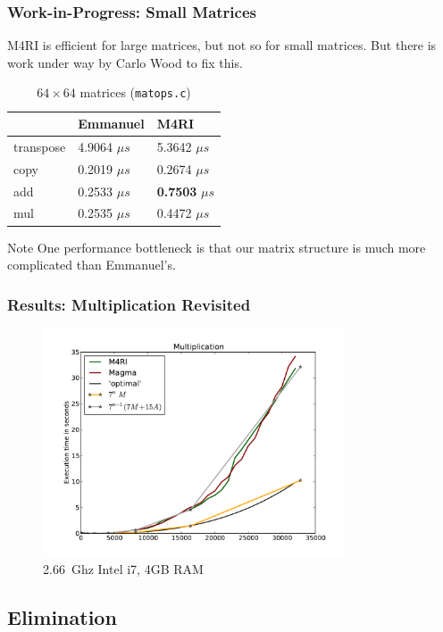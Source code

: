 \documentclass[11pt]{beamer}
\def\hlt{\color{yellow}}
\begin{document}
\begin{frame}
\frametitle{Work-in-Progress: Small Matrices}

M4RI is efficient for large matrices, but not so for small matrices. But there is work under way by Carlo Wood to fix this.

\begin{table}
\begin{tabular}{|l|l|l|}
\hline
 & Emmanuel & M4RI \\ 
\hline
transpose & 4.9064 $\mu s$ & 5.3642 $\mu s$ \\
copy      & 0.2019 $\mu s$ & 0.2674 $\mu s$ \\
add       & 0.2533 $\mu s$ & \textbf{\hlt 0.7503} $\mu s$ \\
mul       & 0.2535 $\mu s$ & 0.4472 $\mu s$ \\
\hline
\end{tabular}
\caption{$64 \times 64$ matrices (\texttt{matops.c})}
\end{table}

\begin{block}{Note}
One performance bottleneck is that our matrix structure is much more complicated than Emmanuel's. 
\end{block}
\end{frame}

\begin{frame}
\frametitle{Results: Multiplication Revisited}
\begin{figure}[h]
 \centering
 \includegraphics[width=0.8\textwidth]{benchmarketing-Multiplication-optimal.pdf}
\caption{2.66~Ghz Intel i7, 4GB RAM}
\end{figure}
\end{frame}

\subsection{Elimination}
\end{document}

